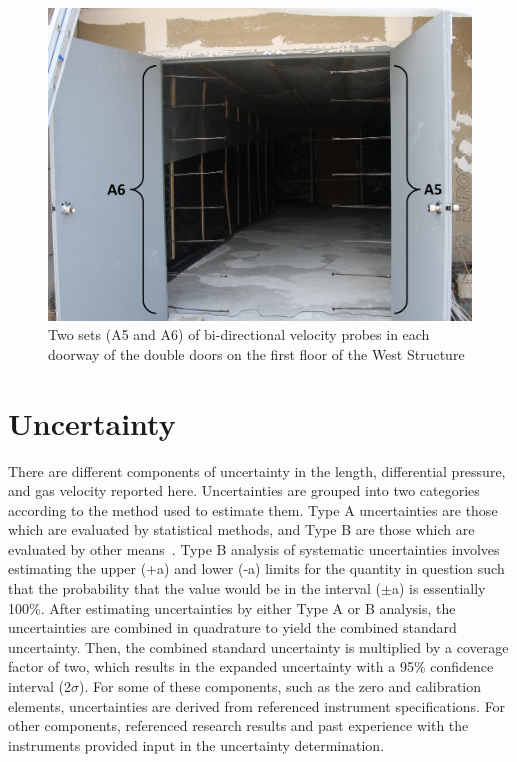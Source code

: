 \documentclass[12pt,oneside]{book}
\begin{document}
\begin{figure}[!ht]
\includegraphics[width=6in]{../Pictures/BDPs}
\caption[Sets of Bi-directional Velocity Probes in Doorway of West Structure]{Two sets (A5 and A6) of bi-directional velocity probes in each doorway of the double doors on the first floor of the West Structure}
\label{fig:BDPs}
\end{figure}

\section{Uncertainty}
\label{sec:Uncertainty}
There are different components of uncertainty in the length, differential pressure, and gas velocity reported here. Uncertainties are grouped into two categories according to the method used to estimate them. Type A uncertainties are those which are evaluated by statistical methods, and Type B are those which are evaluated by other means~\cite{Taylor&Kuyatt:1994}. Type B analysis of systematic uncertainties involves estimating the upper (+a) and lower (-a) limits for the quantity in question such that the probability that the value would be in the interval ($\pm$a) is essentially 100\%. After estimating uncertainties by either Type A or B analysis, the uncertainties are combined in quadrature to yield the combined standard uncertainty. Then, the combined standard uncertainty is multiplied by a coverage factor of two, which results in the expanded uncertainty with a 95\% confidence interval (2$\sigma$). For some of these components, such as the zero and calibration elements, uncertainties are derived from referenced instrument specifications. For other components, referenced research results and past experience with the instruments provided input in the uncertainty determination. 
\end{document}
